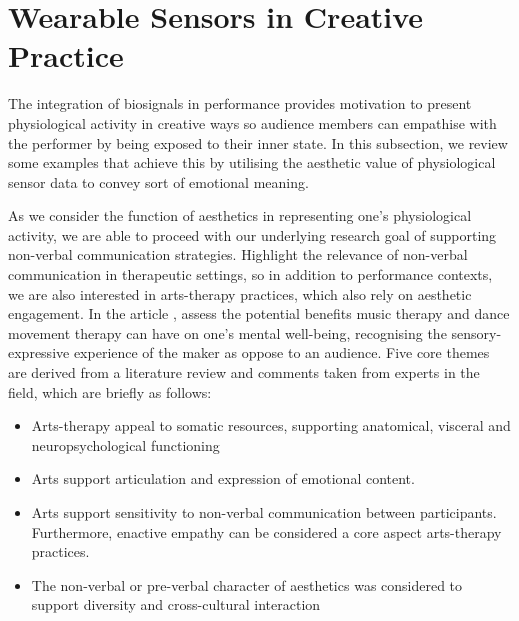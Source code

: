 
\section{Wearable Sensors in Creative Practice}
\label{lit_review:biosignals_creativity}

The integration of biosignals in performance provides motivation to present physiological activity in creative ways so audience members can empathise with the performer by being exposed to their inner state. In this subsection, we review some examples that achieve this by utilising the aesthetic value of physiological sensor data to convey sort of emotional meaning.

As we consider the function of aesthetics in representing one's physiological activity, we are able to proceed with our underlying research goal of supporting non-verbal communication strategies. Highlight the relevance of non-verbal communication in therapeutic settings, so in addition to performance contexts, we are also interested in arts-therapy practices, which also rely on aesthetic engagement. In the article \cite{samaritter_aesthetic_2018}, \citeauthor{samaritter_aesthetic_2018} assess the potential benefits music therapy and dance movement therapy can have on one's mental well-being, recognising the sensory-expressive experience of the maker as oppose to an audience.  Five core themes are derived from a literature review and comments taken from experts in the field, which are briefly as follows:

\begin{itemize}
\item Arts-therapy appeal to somatic resources, supporting anatomical, visceral and neuropsychological functioning
\item Arts support articulation and expression of emotional content.
\item Arts support sensitivity to non-verbal communication between participants. Furthermore, enactive empathy can be considered a core aspect arts-therapy practices.
\item The non-verbal or pre-verbal character of aesthetics was considered to support diversity and cross-cultural interaction
\end{itemize}

